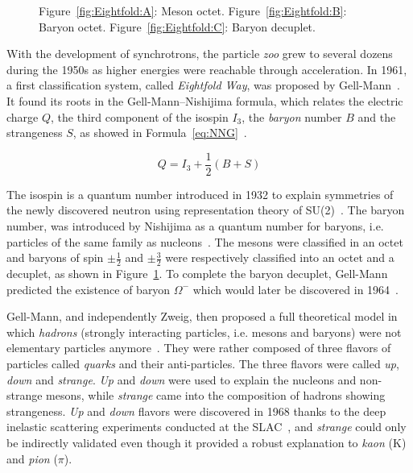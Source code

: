\begin{figure}
\begin{minipage}{\linewidth}
			\subcaption{\label{fig:Eightfold:C}}
		\end{minipage}
		\caption{\label{fig:Eightfold} Figure~\ref{fig:Eightfold:A}: Meson octet. Figure~\ref{fig:Eightfold:B}: Baryon octet. Figure~\ref{fig:Eightfold:C}: Baryon decuplet.}
		\vspace{-5pt}
	\end{figure}
	
	With the development of synchrotrons, the particle \textit{zoo} grew to several dozens during the 1950s as higher energies were reachable through acceleration. In 1961, a first classification system, called \textit{Eightfold Way}, was proposed by Gell-Mann~\cite{GELLMANN1962}. It found its roots in the Gell-Mann--Nishijima formula, which relates the electric charge $Q$, the third component of the isospin $I_3$, the \textit{baryon} number $B$ and the strangeness $S$, as showed in Formula~\ref{eq:NNG}~\cite{NISHIJIMA1953,NISHIJIMA1955,GELLMANN1956}.
	
	\begin{equation}
		\label{eq:NNG}
		Q = I_3 + \frac{1}{2}(B+S)
	\end{equation}
	
	The isospin is a quantum number introduced in 1932 to explain symmetries of the newly discovered neutron using representation theory of SU(2)~\cite{HEISENBERG1932}. The baryon number, was introduced by Nishijima as a quantum number for baryons, i.e. particles of the same family as nucleons~\cite{NISHIJIMA1953}. The mesons were classified in an octet and baryons of spin $\pm\frac{1}{2}$ and $\pm\frac{3}{2}$ were respectively classified into an octet and a decuplet, as shown in Figure~\ref{fig:Eightfold}. To complete the baryon decuplet, Gell-Mann predicted the existence of baryon $\Omega^-$ which would later be discovered in 1964~\cite{BARNES1964}.
	
	Gell-Mann, and independently Zweig, then proposed a full theoretical model in which \textit{hadrons} (strongly interacting particles, i.e. mesons and baryons) were not elementary particles anymore~\cite{GELLMANN1964,ZWEIG1964I,ZWEIG1964II}. They were rather composed of three flavors of particles called \textit{quarks} and their anti-particles. The three flavors were called \textit{up}, \textit{down} and \textit{strange}. \textit{Up} and \textit{down} were used to explain the nucleons and non-strange mesons, while \textit{strange} came into the composition of hadrons showing strangeness. \textit{Up} and \textit{down} flavors were discovered in 1968 thanks to the deep inelastic scattering experiments conducted at the \acf{SLAC}~\cite{BLOOM1969,BREIDENBACH1969}, and \textit{strange} could only be indirectly validated even though it provided a robust explanation to \textit{kaon} (K) and \textit{pion} ($\pi$).
	
